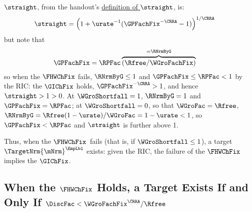 \documentclass{econark}
\begin{document}
$\straight$, from the handout's \hyperref[eq:straightDef]{definition of $\straight$}, is:
\begin{equation}\begin{gathered}\begin{aligned}
  \straight & =  \left(1+\urate^{-1}(\GPFachFix^{-\CRRA}-1)\right)^{1/\CRRA}
\end{aligned}\end{gathered}\end{equation}
but note that 
\begin{equation}\begin{gathered}\begin{aligned}
  \GPFachFix & =  \RPFac \overbrace{(\Rfree/\WGroFachFix)}^{=\RNrmByG}
\end{aligned}\end{gathered}\end{equation}
so when the $\FHWChFix$ fails, $\RNrmByG \leq 1$ and $\GPFachFix \leq \RPFac < 1$ by the RIC: the $\GIChFix$ holds, $\GPFachFix^{-\CRRA} > 1$, and hence $\straight > 1 > 0$.  At $\WGroShortfall=1$, $\RNrmByG = 1$ and $\GPFachFix = \RPFac$; at $\WGroShortfall=0$, so that $\WGroFac=\Rfree$, $\RNrmByG=\Rfree(1-\urate)/\WGroFac=1-\urate<1$, so $\GPFachFix < \RPFac$ and $\straight$ is further above 1.  

Thus, when the $\FHWChFix$~fails (that is, if $\WGroShortfall \leq 1$), a target $\TargetNrm{\mNrm}^{\EmpLbl}$ exists: given the RIC, the failure of the $\FHWChFix$ implies the $\GIChFix$.  

\subsection{When the $\FHWChFix$ Holds, a Target Exists If and Only If $\DiscFac < \WGroFachFix^{\CRRA}/\Rfree$}\label{sec:TractableBufferStock-TargetWhenFHWChFixHolds}
\end{document}
